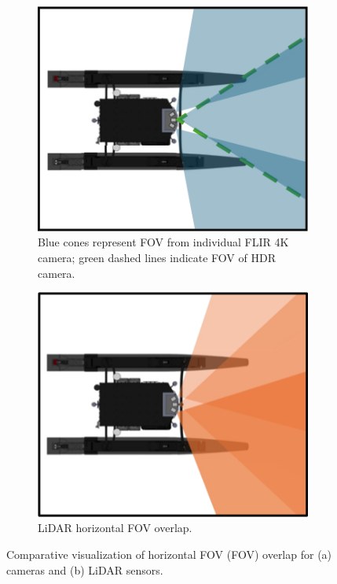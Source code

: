 \documentclass[../main.tex]{subfiles}
\begin{document}
\begin{figure}[htbp]
\centering
\begin{subfigure}[t]{0.48\textwidth}
    \centering
    \includegraphics[width=\textwidth]{Images/fov_cam.png}
    \caption{Blue cones represent \ac{FOV} from individual FLIR 4K camera; green dashed lines indicate \ac{FOV} of HDR camera.}
    \label{fig:fov_cam}
\end{subfigure}
\hfill
\begin{subfigure}[t]{0.48\textwidth}
    \centering
    \includegraphics[width=\textwidth]{Images/fov_LiDAR.png}
    \caption{LiDAR horizontal \ac{FOV} overlap.}
    \label{fig:fov_LiDAR}
\end{subfigure}
\caption{Comparative visualization of horizontal \ac{FOV} (FOV) overlap for (a) cameras and (b) LiDAR sensors.}
\label{fig:fov_combined}
\end{figure}
\end{document}
